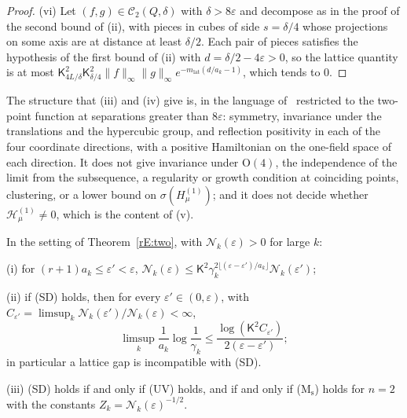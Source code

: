 \begin{proof}
(vi) Let $(f,g)\in\mathcal C_2(Q,\delta)$ with $\delta>8\varepsilon$ and
decompose as in the proof of the second bound of (ii), with pieces in cubes
of side $s=\delta/4$ whose projections on some axis are at distance at least
$\delta/2$. Each pair of pieces satisfies the hypothesis of the first bound
of (ii) with $d=\delta/2-4\varepsilon>0$, so the lattice quantity is at most
$\mathsf K_{4L/\delta}^2\mathsf K_{\delta/4}^2\|f\|_\infty\|g\|_\infty
e^{-m_{\mathrm{lat}}(d/a_k-1)}$, which tends to $0$.
\end{proof}

The structure that (iii) and (iv) give is, in the language of~\cite{OS73}
restricted to the two-point function at separations greater than
$8\varepsilon$: symmetry, invariance under the translations and the
hypercubic group, and reflection positivity in each of the four coordinate
directions, with a positive Hamiltonian on the one-field space of each
direction. It does not give invariance under $\mathrm O(4)$, the
independence of the limit from the subsequence, a regularity or growth
condition at coinciding points, clustering, or a lower bound on
$\sigma(H^{(1)}_\mu)$; and it does not decide whether $\mathcal H^{(1)}_\mu
\ne0$, which is the content of (v).

\begin{corollary}\label{rE:gapbound}
In the setting of Theorem~\textup{\ref{rE:two}}, with
$\mathcal N_k(\varepsilon)>0$ for large $k$:

\textup{(i)} for $(r+1)a_k\le\varepsilon'<\varepsilon$,
$\mathcal N_k(\varepsilon)\le\mathsf K^2\gamma_k^{2\lfloor(\varepsilon-
\varepsilon')/a_k\rfloor}\mathcal N_k(\varepsilon')$;

\textup{(ii)} if \textup{(SD)} holds, then for every $\varepsilon'\in(0,
\varepsilon)$, with $C_{\varepsilon'}=\limsup_k\mathcal N_k(\varepsilon')/
\mathcal N_k(\varepsilon)<\infty$,
\[
\limsup_k\frac1{a_k}\log\frac1{\gamma_k}\le\frac{\log(\mathsf K^2C_{
\varepsilon'})}{2(\varepsilon-\varepsilon')} ;
\]
in particular a lattice gap is incompatible with \textup{(SD)}.

\textup{(iii)} \textup{(SD)} holds if and only if \textup{(UV)} holds, and if
and only if \textup{(M$_{\mathrm s}$)} holds for $n=2$ with the constants
$Z_k=\mathcal N_k(\varepsilon)^{-1/2}$.
\end{corollary}

